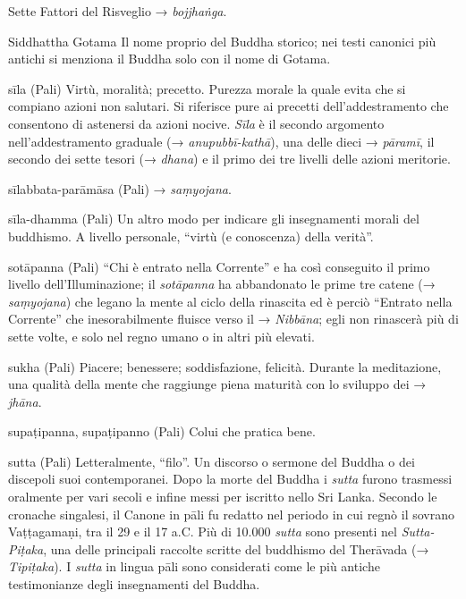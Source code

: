 \begin{glossarydescription}
\item[Sette Fattori del Risveglio] → \emph{bojjhaṅga}.

\item[Siddhattha Gotama] Il nome proprio del Buddha storico; nei testi
canonici più antichi si menziona il Buddha solo con il nome di Gotama.

\item[sīla] (Pali) Virtù, moralità; precetto. Purezza morale la quale evita
che si compiano azioni non salutari. Si riferisce pure ai precetti
dell'addestramento che consentono di astenersi da azioni nocive.
\emph{Sīla} è il secondo argomento nell'addestramento graduale (→
\emph{anupubbī-kathā}), una delle dieci → \emph{pāramī}, il secondo dei
sette tesori (→ \emph{dhana}) e il primo dei tre livelli delle azioni
meritorie.

\item[sīlabbata-parāmāsa] (Pali) → \emph{saṃyojana}.

\item[sīla-dhamma] (Pali) Un altro modo per indicare gli insegnamenti morali
del buddhismo. A livello personale, ``virtù (e conoscenza) della
verità''.

\item[sotāpanna] (Pali) ``Chi è entrato nella Corrente'' e ha così conseguito
il primo livello dell'Illuminazione; il \emph{sotāpanna} ha abbandonato
le prime tre catene (→ \emph{saṃyojana}) che legano la mente al ciclo
della rinascita ed è perciò ``Entrato nella Corrente'' che
inesorabilmente fluisce verso il → \emph{Nibbāna}; egli non rinascerà
più di sette volte, e solo nel regno umano o in altri più elevati.

\item[sukha] (Pali) Piacere; benessere; soddisfazione, felicità. Durante la
meditazione, una qualità della mente che raggiunge piena maturità con lo
sviluppo dei → \emph{jhāna}.

\item[supaṭipanna, supaṭipanno] (Pali) Colui che pratica bene.

\item[sutta] (Pali) Letteralmente, ``filo''. Un discorso o sermone del Buddha
o dei discepoli suoi contemporanei. Dopo la morte del Buddha i
\emph{sutta} furono trasmessi oralmente per vari secoli e infine messi
per iscritto nello Sri Lanka. Secondo le cronache singalesi, il Canone
in pāli fu redatto nel periodo in cui regnò il sovrano Vaṭṭagamaṇi, tra
il 29 e il 17 a.C. Più di 10.000 \emph{sutta} sono presenti nel
\emph{Sutta-Piṭaka}, una delle principali raccolte scritte del buddhismo
del Therāvada (→ \emph{Tipiṭaka}). I \emph{sutta} in lingua pāli sono
considerati come le più antiche testimonianze degli insegnamenti del
Buddha.


\end{glossarydescription}
